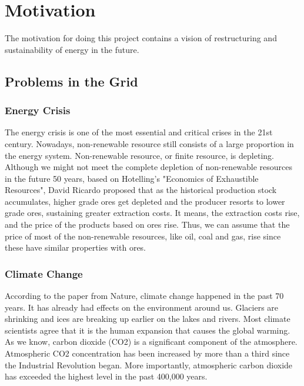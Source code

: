\section{Motivation} %
The motivation for doing this project contains a vision of restructuring and sustainability of energy in the future.
\subsection{Problems in the Grid}
\subsubsection{Energy Crisis}
The energy crisis is one of the most essential and critical crises in the 21st century. Nowadays, non-renewable resource still consists of a large proportion in the energy system. Non-renewable resource, or finite resource, is depleting. Although we might not meet the complete depletion of non-renewable resources in the future 50 years, based on Hotelling’s "Economics of Exhaustible Resources", David Ricardo proposed that \cite{devarajan1981hotelling} as the historical production stock accumulates, higher grade ores get depleted and the producer resorts to lower grade ores, sustaining greater extraction costs. It means, the extraction costs rise, and the price of the products based on ores rise. Thus, we can assume that the price of most of the non-renewable resources, like oil, coal and gas, rise since these have similar properties with ores. 

\subsubsection{Climate Change}
According to the paper from Nature, \cite{parmesan2003globally} climate change happened in the past 70 years. It has already had effects on the environment around us. Glaciers are shrinking and ices are breaking up earlier on the lakes and rivers. Most climate scientists agree that \cite{epic337530} it is the human expansion that causes the global warming. As we know, carbon dioxide (CO2) is a significant component of the atmosphere. \cite{epic337530} Atmospheric CO2 concentration has been increased by more than a third since the Industrial Revolution began. More importantly, atmospheric carbon dioxide has exceeded the highest level in the past 400,000 years. 


